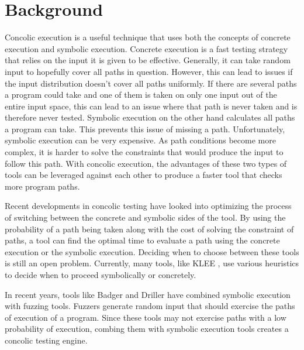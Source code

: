 \section{Background}

Concolic execution is a useful technique that uses both the concepts 
of concrete execution and symbolic execution. Concrete execution is
a fast testing strategy that relies on the input it is given to be 
effective. Generally, it can take random input to hopefully cover
all paths in question. However, this can lead to issues if the input
distribution doesn't cover all paths uniformly. If there are several
paths a program could take and one of them is taken on only one input
out of the entire input space, this can lead to an issue where that path
is never taken and is therefore never tested. Symbolic execution on the
other hand calculates all paths a program can take. This prevents this
issue of missing a path. Unfortunately, symbolic execution can be very
expensive. As path conditions become more complex, it is harder to 
solve the constraints that would produce the input to follow this path.
With concolic execution, the advantages of these two types of tools can
be leveraged against each other to produce a faster tool that checks more
program paths. 

Recent developments in concolic testing have looked into optimizing the
process of switching between the concrete and symbolic sides of the tool\cite{Wang:2018:TOC:3180155.3180177}.
By using the probability of a path being taken along with the cost of
solving the constraint of paths, a tool can find the optimal time to
evaluate a path using the concrete execution or the symbolic execution.
Deciding when to choose between these tools is still an open problem.
Currently, many tools, like KLEE \cite{cadar2008klee}, use various heuristics to 
decide when to proceed  symbolically or concretely. 

In recent years, tools like Badger \cite{Noller:2018:BCA:3213846.3213868}
and Driller \cite{stephens2016driller} have combined symbolic execution
with fuzzing tools. Fuzzers generate random input that should exercise
the paths of execution of a program. Since these tools may not exercise paths
with a low probability of execution, combing them with symbolic execution
tools creates a concolic testing engine.